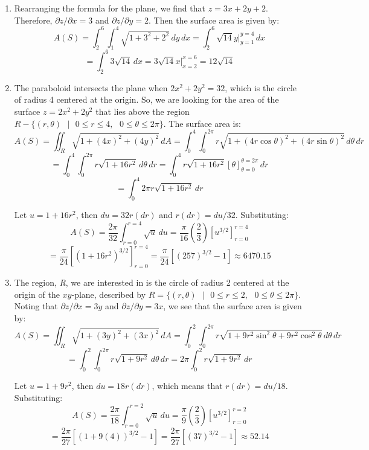 \begin{Answer}[ref = surface]
\begin{enumerate}
\item Rearranging the formula for the plane, we find that $z = 3x + 2y + 2$. Therefore, $\partial z / \partial x = 3$ and $\partial z / \partial y = 2$. 
Then the surface area is given by:
$$A(S) = \int_2^6 \int_1^4 \sqrt{1 + 3^2 + 2^2}\,dy\,dx = \int_2^6 \sqrt{14}y|_
{y = 1}^{y = 4}\,dx$$
$$= \int_2^6 3\sqrt{14}\,dx = 3\sqrt{14}x|_{x = 2}^{x = 6} = 12\sqrt{14}$$
\item The paraboloid intersects the plane when $2x^2 + 2y^2 = 32$, which is the
circle of radius 4 centered at the origin. So, we are looking for the area of 
the surface $z = 2x^2 + 2y^2$ that lies above the region $\textit{R} - \{(r, 
\theta)\text{ }|\text{ }0 \leq r \leq 4,\text{ } 0 \leq \theta \leq 2\pi \}$. 
The surface area is:
$$A(S) = \iint_{\textit{R}} \sqrt{1 + \left(4x \right)^2 + \left( 4y \right)^2}
\,dA = \int_0^4 \int_0^{2\pi} r \sqrt{1 + \left(4 r \cos{\theta} \right)^2 + 
\left( 4 r \sin{\theta} \right)^2}\,d\theta\,dr$$
$$= \int_0^4 \int_0^{2\pi} r \sqrt{1 + 16r^2}\,d\theta\,dr = \int_0^4 r \sqrt{
1 + 16r^2} \left[\theta \right]_{\theta = 0}^{\theta = 2\pi}\,dr$$
$$= \int_0^4 2\pi r \sqrt{1 + 16r^2}\,dr$$

Let $u = 1 + 16r^2$, then $du = 32r (dr)$ and $r(dr) = du/32$. Substituting:
$$A(S) = \frac{2\pi}{32} \int_{r = 0}^{r = 4} \sqrt{u}\,du = \frac{\pi}{16} 
\left( \frac{2}{3} \right) \left[u^{3/2} \right]_{r = 0}^{r = 4}$$
$$= \frac{\pi}{24} \left[ \left(1 + 16r^2 \right)^{3/2} \right]_{r = 0}^{r = 4}
= \frac{\pi}{24} \left[ \left(257 \right)^{3/2} - 1\right] \approx 6470.15$$

\item The region, \textit{R}, we are interested in is the circle of radius 2 
centered at the origin of the $xy$-plane, described by $\textit{R} = \{(r, 
\theta)\text{ }|\text{ }0 \leq r \leq 2,\text{ }0 \leq \theta \leq 2\pi \}$. 
Noting that $\partial z / \partial x = 3y$ and $\partial z / \partial y = 3x$, 
we see that the surface area is given by:
$$A(S) = \iint_{\textit{R}} \sqrt{1 + \left(3y \right)^2 + \left( 3x \right)^2}
\,dA = \int_0^2 \int_0^{2\pi} r \sqrt{1 + 9r^2\sin^2{\theta} + 9r^2\cos^2{
\theta}}\,d\theta\,dr$$
$$= \int_0^2 \int_0^{2\pi} r \sqrt{1 + 9r^2}\,d\theta\,dr = 2\pi \int_0^2 r 
\sqrt{1 + 9r^2}\,dr$$

Let $u = 1 + 9r^2$, then $du = 18r(dr)$, which means that $r(dr) = du/18$. 
Substituting:
$$A(S) = \frac{2\pi}{18} \int_{r = 0}^{r = 2} \sqrt{u}\,du = \frac{\pi}{9} 
\left( \frac{2}{3} \right) \left[ u^{3/2} \right]_{r = 0}^{r = 2}$$
$$= \frac{2\pi}{27} \left[ \left(1 + 9(4) \right)^{3/2} - 1 \right] = \frac{2
\pi}{27} \left[ \left(37 \right)^{3/2} - 1 \right] \approx 52.14$$
\end{enumerate}
\end{Answer}


